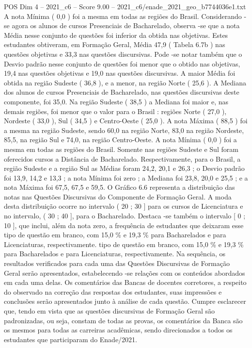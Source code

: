 \begin{textsample}{POS Dim 4 – 2021\_c6 – Score 9.00 – 2021\_c6/enade\_2021\_geo\_b7744036e1.txt}
A nota Mínima ( 0,0 ) foi a mesma em todas as regiões do Brasil.
Considerando -se agora os alunos de cursos Presenciais de Bacharelado, observa -se que a nota Média nesse conjunto de questões foi inferior da obtida nas objetivas.
Estes estudantes obtiveram, em Formação Geral, Média 47,9 ( Tabela 6.7b ) nas questões objetivas e 33,3 nas questões discursivas.
Pode -se notar também que o Desvio padrão nesse conjunto de questões foi menor que o obtido nas objetivas, 19,4 nas questões objetivas e 19,0 nas questões discursivas.
A maior Média foi obtida na região Sudeste ( 36,8 ), e a menor, na região Norte ( 25,6 ).
A Mediana dos alunos de cursos Presenciais de Bacharelado, nas questões discursivas deste componente, foi 35,0.
Na região Sudeste ( 38,5 ) a Mediana foi maior e, nas demais regiões, foi menor que o valor para o Brasil : regiões Norte ( 27,0 ), Nordeste ( 33,0 ), Sul ( 34,5 ) e Centro-Oeste ( 25,0 ).
A nota Máxima ( 88,5 ) foi a mesma na região Sudeste, sendo 60,0 na região Norte, 83,0 na região Nordeste, 85,5, na região Sul e 74,0, na região Centro-Oeste.
A nota Mínima ( 0,0 ) foi a mesma em todas as regiões do Brasil.
Somente nas regiões Sudeste e Sul foram oferecidos cursos a Distância de Bacharelado.
Respectivamente, para o Brasil, a região Sudeste e a região Sul as Médias foram 24,2, 20,1 e 26,3 ; o Desvio padrão foi 13,9, 14,2 e 13,3 ; a nota Mínima foi zero ; a Mediana foi 23,8, 20,0 e 25,5 ; e a nota Máxima foi 67,5, 67,5 e 59,5.
O Gráfico 6.6 representa a distribuição das notas nas Questões Discursivas do Componente de Formação Geral.
A moda desta distribuição ocorre no intervalo ( 20 ; 30 ] para os cursos de Licenciatura e no intervalo, ( 30 ; 40 ], para o Bacharelado.
Destaca -se também o intervalo [ 0 ; 10 ], que inclui, além da nota zero, a frequência de estudantes que deixaram esse tipo de questão em branco, com 15,0 \% e 19,3 \% para Bacharelados e para Licenciaturas, respectivamente. tipo de questão em branco, com 15,0 \% e 19,3 \% para Bacharelados e para Licenciaturas, respectivamente.
Na sequência, os resultados verificados para cada uma das Questões Discursivas de Formação Geral serão apresentados, estabelecendo -se relações com os conteúdos abordados em cada uma delas.
Os comentários das Bancas de docentes corretores, a respeito do observado na correção das respostas dos estudantes, suas impressões e conclusões serão apresentados junto à análise de cada questão.
Cumpre esclarecer que, tendo em vista que as questões discursivas de Formação Geral são padronizadas, ou seja, constam de todas as provas, os comentários da Banca são os mesmos para todas as carreiras acadêmicas, sendo direcionados a todos os estudantes que participaram do Enade/2021.

\end{textsample}
